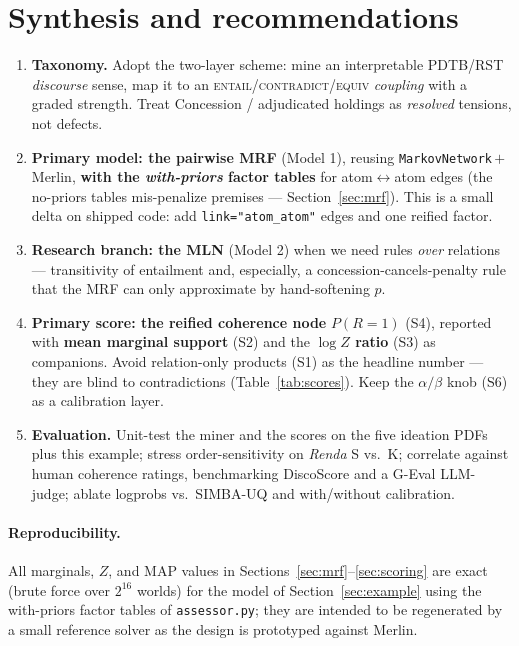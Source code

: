 \documentclass[11pt]{article}
\begin{document}
\section{Synthesis and recommendations}
\label{sec:synthesis}

\begin{enumerate}[leftmargin=*]
  \item \textbf{Taxonomy.} Adopt the two-layer scheme: mine an interpretable PDTB/RST
        \emph{discourse} sense, map it to an \textsc{entail}/\textsc{contradict}/\textsc{equiv}
        \emph{coupling} with a graded strength. Treat Concession / adjudicated holdings as
        \emph{resolved} tensions, not defects.
  \item \textbf{Primary model: the pairwise MRF} (Model 1), reusing
        \texttt{MarkovNetwork}\,$+$\,Merlin, \textbf{with the \emph{with-priors} factor
        tables} for atom$\leftrightarrow$atom edges (the no-priors tables mis-penalize
        premises --- Section~\ref{sec:mrf}). This is a small delta on shipped code:
        add \texttt{link="atom\_atom"} edges and one reified factor.
  \item \textbf{Research branch: the MLN} (Model 2) when we need rules \emph{over} relations
        --- transitivity of entailment and, especially, a concession-cancels-penalty rule
        that the MRF can only approximate by hand-softening $p$.
  \item \textbf{Primary score: the reified coherence node} $P(R{=}1)$ (S4), reported with
        \textbf{mean marginal support} (S2) and the \textbf{$\log Z$ ratio} (S3) as
        companions. Avoid relation-only products (S1) as the headline number --- they are
        blind to contradictions (Table~\ref{tab:scores}). Keep the $\alpha/\beta$ knob (S6)
        as a calibration layer.
  \item \textbf{Evaluation.} Unit-test the miner and the scores on the five ideation PDFs
        plus this example; stress order-sensitivity on \emph{Renda} S vs.\ K; correlate
        against human coherence ratings, benchmarking DiscoScore \citep{discoscore} and a
        G-Eval \citep{geval} LLM-judge; ablate logprobs vs.\ SIMBA-UQ and with/without
        calibration.
\end{enumerate}

\paragraph{Reproducibility.} All marginals, $Z$, and MAP values in
Sections~\ref{sec:mrf}--\ref{sec:scoring} are exact (brute force over $2^{16}$ worlds) for
the model of Section~\ref{sec:example} using the with-priors factor tables of
\texttt{assessor.py}; they are intended to be regenerated by a small reference solver as
the design is prototyped against Merlin.
\end{document}
